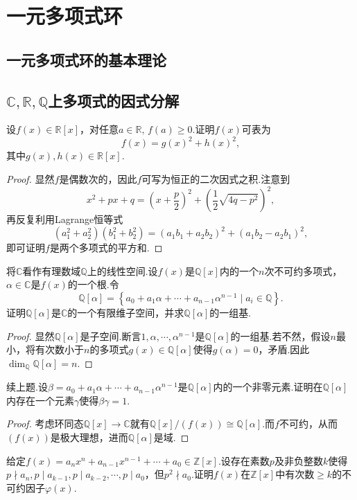 \section{一元多项式环}
\subsection{一元多项式环的基本理论}
\subsection{$\mathbb{C},\mathbb{R},\mathbb{Q}$上多项式的因式分解}
\begin{prob}[2]
	设$f(x)\in\mathbb{R}[x]$，对任意$a\in\mathbb{R},\,f(a)\ge0$.证明$f(x)$可表为
	\[
		f(x)=g(x)^2+h(x)^2,
	\]
	其中$g(x),h(x)\in\mathbb{R}[x]$.
\end{prob}
\begin{proof}
	显然$f$是偶数次的，因此$f$可写为恒正的二次因式之积.注意到
	\[
		x^2+px+q=\left(x+\frac{p}{2}\right)^2+\left(\frac{1}{2}\sqrt{4q-p^2}\right)^2,
	\]
	再反复利用Lagrange恒等式
	\[
		(a_1^2+a_2^2)(b_1^2+b_2^2)=(a_1b_1+a_2b_2)^2+(a_1b_2-a_2b_1)^2,
	\]
	即可证明$f$是两个多项式的平方和.
\end{proof}
\begin{prob}[3]
	将$\mathbb{C}$看作有理数域$\mathbb{Q}$上的线性空间.设$f(x)$是$\mathbb{Q}[x]$内的一个$n$次不可约多项式，$\alpha\in\mathbb{C}$是$f(x)$的一个根.令
	\[
		\mathbb{Q}[\alpha]=\left\{a_0+a_1\alpha+\cdots+a_{n-1}\alpha^{n-1}\mid a_i\in\mathbb{Q}\right\}.
	\]
	证明$\mathbb{Q}[\alpha]$是$\mathbb{C}$的一个有限维子空间，并求$\mathbb{Q}[\alpha]$的一组基.
\end{prob}
\begin{proof}
	显然$\mathbb{Q}[\alpha]$是子空间.断言$1,\alpha,\cdots,\alpha^{n-1}$是$\mathbb{Q}[\alpha]$的一组基.若不然，假设$n$最小，将有次数小于$n$的多项式$g(x)\in\mathbb{Q}[\alpha]$使得$g(\alpha)=0$，矛盾.因此$\dim_{\mathbb{Q}}\mathbb{Q}[\alpha]=n$.
\end{proof}
\begin{prob}[4]
	续上题.设$\beta=a_0+a_1\alpha+\cdots+a_{n-1}\alpha^{n-1}$是$\mathbb{Q}[\alpha]$内的一个非零元素.证明在$\mathbb{Q}[\alpha]$内存在一个元素$\gamma$使得$\beta\gamma=1$.
\end{prob}
\begin{proof}
	考虑环同态$\mathbb{Q}[x]\to\mathbb{C}$就有$\mathbb{Q}[x]/(f(x))\cong\mathbb{Q}[\alpha]$.而$f$不可约，从而$(f(x))$是极大理想，进而$\mathbb{Q}[\alpha]$是域.
\end{proof}
\begin{prob}[6]
	给定$f(x)=a_nx^n+a_{n-1}x^{n-1}+\cdots+a_0\in\mathbb{Z}[x]$.设存在素数$p$及非负整数$k$使得$p\nmid a_n,p\mid a_{k-1},p\mid a_{k-2},\cdots,p\mid a_0$，但$p^2\nmid a_0$.证明$f(x)$在$\mathbb{Z}[x]$中有次数$\ge k$的不可约因子$\varphi(x)$.
\end{prob}
